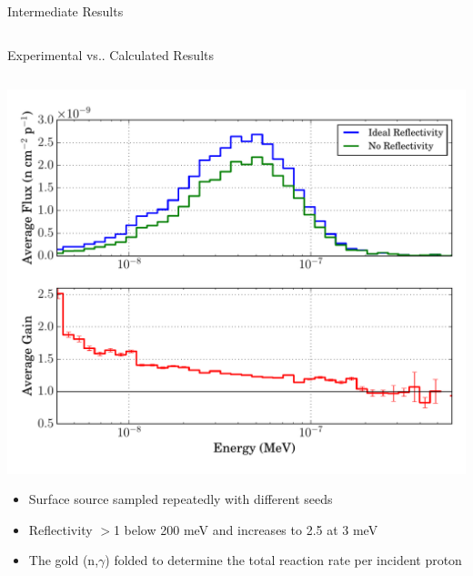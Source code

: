 \documentclass[final,t]{beamer}
\makeatletter
\DeclareRobustCommand\onedot{\futurelet\@let@token\@onedot}
\def\@onedot{\ifx\@let@token.\else.\null\fi\xspace}
\def\vs{{vs}\onedot}
\makeatother
\begin{document}
\begin{frame}{}
\begin{columns}[t]
\begin{column}{.3\linewidth}
\begin{block}{Intermediate Results}
\begin{columns}
\begin{column}{0.3\linewidth}
      \end{column}

      \end{columns}

      \end{block}


      \begin{block}{Experimental \vs Calculated Results}

      \begin{columns}

      \begin{column}{0.5\linewidth}

      \begin{center}
      \includegraphics*[width=\linewidth]{gain.pdf}
      \end{center}

      \begin{itemize}
      \item Surface source sampled repeatedly with different seeds  
      \item Reflectivity $>$1 below 200 meV and increases to 2.5 at 3 meV
      \item The gold (n,$\gamma$) folded to determine the total reaction rate per incident proton
      \end{itemize}

      \end{column}



\end{columns}
\end{block}
\end{column}
\end{columns}
\end{frame}
\end{document}
